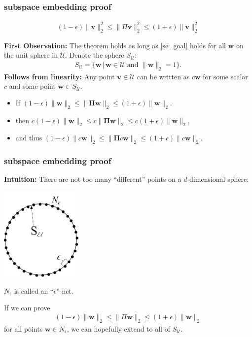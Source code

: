 \documentclass[compress]{beamer}
\newcommand{\bs}[1]{\boldsymbol{#1}}
\newcommand{\bv}[1]{\mathbf{#1}}
\begin{document}
\begin{frame}
	\frametitle{subspace embedding proof}
	\begin{align}
		(1-\epsilon) \|\bv{v}\|_2^2 \leq \|\Pi \bv{v}\|_2^2 \leq	(1+\epsilon)\|\bv{v}\|_2^2
	\end{align}

	\textbf{First Observation:}
	The theorem holds as long as \eqref{se_goal} holds for all $\bv{w}$ on the unit sphere in $\mathcal{U}$. Denote the sphere $S_{\mathcal{U}}$:
	\begin{align*}
		S_{\mathcal{U}} = \{\bv{w} \,|\, \bv{w}\in \mathcal{U} \text{ and } \|\bv{w}\|_2 = 1 \}. 
	\end{align*}
	\textbf{Follows from linearity:} Any point $\bv{v} \in \mathcal{U}$ can be written as $c \bv{w}$ for some scalar $c$ and some point $\bv{w} \in S_{\mathcal{U}}$. 
	\begin{center}
		\begin{itemize}
			\item If $(1-\epsilon)\|\bv{w}\|_2 \leq \|\bs{\Pi} \bv{w}\|_2 \leq	(1+\epsilon)\|\bv{w}\|_2$. 
			\item then ${c}(1-\epsilon)\|\bv{w}\|_2 \leq {c}\|\bs{\Pi} \bv{w}\|_2 \leq	{c}(1+\epsilon)\|\bv{w}\|_2$,
			\item and thus $(1-\epsilon)\|c\bv{w}\|_2 \leq \|\bs{\Pi} c\bv{w}\|_2 \leq	(1+\epsilon)\|c\bv{w}\|_2$.
		\end{itemize}  
	\end{center}
\end{frame}


\begin{frame}
	\frametitle{subspace embedding proof}
	\textbf{Intuition:} There are not too many ``different'' points on a $d$-dimensional sphere:
	\vspace{-1em}
	\begin{center}
		\includegraphics[width=0.3\textwidth]{2dnet.png}
	\end{center}
	$N_\epsilon$ is called an ``$\epsilon$''-net.
	
	If we can prove
	\begin{align*}
		(1-\epsilon)\|\bv{w}\|_2 \leq \|\Pi \bv{w}\|_2 \leq	(1+\epsilon)\|\bv{w}\|_2
	\end{align*} 
	for all points $\bv{w} \in N_\epsilon$, we can hopefully extend to all of $S_{\mathcal{U}}$. 
\end{frame}
\end{document}
